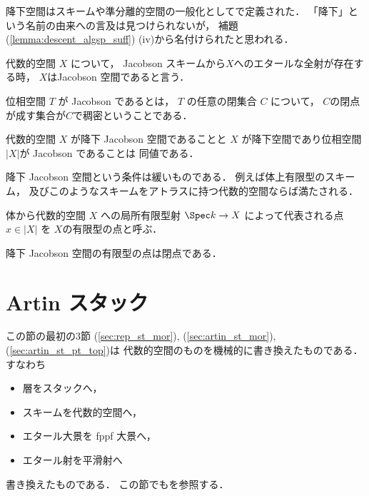     \begin{Remark}
        降下空間はスキームや準分離的空間の一般化として\cite{SP}で定義された．
        「降下」という名前の由来への言及は見つけられないが，
        補題(\ref{lemma:descent_algsp_suff}) (iv)から名付けられたと思われる．
    \end{Remark}

    \begin{Def}
        代数的空間 $X$ について，
        Jacobson スキームから$X$へのエタールな全射が存在する時，
        $X$はJacobson 空間であると言う．
    \end{Def}

    \begin{Lemma}[\cite{SP} 0BA6]
        位相空間 $T$ が Jacobson であるとは，
        $T$ の任意の閉集合 $C$ について，
        $C$の閉点が成す集合が$C$で稠密ということである．

        代数的空間 $X$ が降下 Jacobson 空間であることと
        $X$ が降下空間であり位相空間$|X|$が Jacobson であることは
        同値である．
    \end{Lemma}

    \begin{Remark}
        降下 Jacobson 空間という条件は緩いものである．
        例えば体上有限型のスキーム，
        及びこのようなスキームをアトラスに持つ代数的空間ならば満たされる．
    \end{Remark}

    \begin{Def}
        体から代数的空間 $X$ への局所有限型射 $\Spec k \to X$
        によって代表される点 $x \in |X|$ を
        $X$の有限型の点と呼ぶ．
    \end{Def}

    \begin{Lemma}[\cite{SP} 0AB5]\label{lemma:descent_jac_cldpt}
        降下 Jacobson 空間の有限型の点は閉点である．
    \end{Lemma}

\section{Artin スタック}
    この節の最初の$3$節 
    (\ref{sec:rep_st_mor}), (\ref{sec:artin_st_mor}), (\ref{sec:artin_st_pt_top})は
    代数的空間のものを機械的に書き換えたものである．
    すなわち
    \begin{itemize}
        \item 層をスタックへ，
        \item スキームを代数的空間へ，
        \item エタール大景を fppf 大景へ，
        \item エタール射を平滑射へ
    \end{itemize}
    書き換えたものである．
    この節でも\cite{Olsson16,LMB,SP}を参照する．

